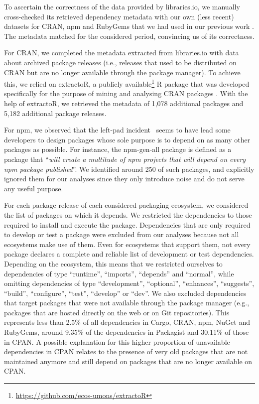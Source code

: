 \documentclass[smallextended]{svjour3}       %
\newcommand{\ie}{i.e.,\xspace}
\newcommand{\eg}{e.g.,\xspace}
\newcommand{\cran}{\textsf{CRAN}\xspace}
\newcommand{\cpan}{\textsf{CPAN}\xspace}
\newcommand{\rubygems}{\textsf{RubyGems}\xspace}
\newcommand{\packagist}{\textsf{Packagist}\xspace}
\newcommand{\cargo}{\textsf{Cargo}\xspace}
\newcommand{\nuget}{\textsf{NuGet}\xspace}
\newcommand{\npm}{\textsf{npm}\xspace}
\newcommand{\git}{\textsf{Git}\xspace}
\newcommand{\R}{\textsf{R}\xspace}
\begin{document}
To ascertain the correctness of the data provided by \textsf{libraries.io}, we manually cross-checked its retrieved dependency metadata with our own (less recent) datasets for \cran, \npm and \rubygems that we had used in our previous work \cite{Decan2017SANER}. The metadata matched for the considered period, convincing us of its correctness. 

For \cran, we completed the metadata extracted from \textsf{libraries.io} with data about archived package releases (\ie releases that used to be distributed on \cran but are no longer available through the package manager). To achieve this, we relied on \textsf{extractoR}, a publicly available\footnote{\url{https://github.com/ecos-umons/extractoR}} \R package that was developed specifically for the purpose of mining and analysing \cran packages \cite{ClaesMG2014}. 
With the help of \textsf{extractoR}, we retrieved the metadata of 1,078 additional packages and 5,182 additional package releases.


For \npm, we observed that the \textsf{left-pad} incident~\cite{NPM2016,Haney2016} seems to have lead some developers to design packages whose sole purpose is to depend on as many other packages as possible. For instance, the \textsf{npm-gen-all} package is defined as a package that ``\emph{will create a multitude of \npm projects that will depend on every \npm package published}''. We identified around 250 of such packages, and explicitly ignored them for our analyses since they only introduce noise and do not serve any useful purpose. 

For each package release of each considered packaging ecosystem, we considered the list of packages on which it depends. 
We restricted the dependencies to those required to install and execute the package. Dependencies that are only required to develop or test a package were excluded from our analyses because not all ecosystems make use of them. Even for ecosystems that support them, not every package declares a complete and reliable list of development or test dependencies.
Depending on the ecosystem, this means that we restricted ourselves to dependencies of type ``runtime'', ``imports'', ``depends'' and ``normal'', while omitting dependencies of type ``development'', ``optional'', ``enhances'', ``suggests'', ``build'', ``configure'', ``test'', ``develop'' or ``dev''.
%
We also excluded dependencies that target packages that were not available through the package manager (\eg packages that are hosted directly on the web or on \git repositories). This represents less than 2.5\% of all dependencies in \cargo, \cran, \npm, \nuget and \rubygems, around 9.35\% of the dependencies in \packagist and 30.11\% of those in \cpan. A possible explanation for this higher proportion of unavailable dependencies in \cpan relates to the presence of very old packages that are not maintained anymore and still depend on packages that are no longer available on \cpan.
\end{document}
